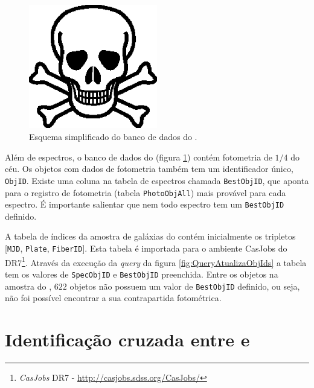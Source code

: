 \begin{figure}
	\includegraphics[width=0.5\textwidth]{figuras/test.eps}
	\caption[Esquema simplificado do banco de dados do \SDSS.]
	{Esquema simplificado do banco de dados do \SDSS.}
	\label{fig:EsquemaSDSS}
\end{figure}

Além de espectros, o banco de dados do \SDSS (figura \ref{fig:EsquemaSDSS})
contém fotometria de $1/4$ do céu. Os objetos com dados de fotometria também tem
um identificador único, \texttt{ObjID}. Existe uma coluna na tabela de espectros
chamada \texttt{BestObjID}, que aponta para o registro de fotometria (tabela
{\tt PhotoObjAll}) mais provável para cada espectro. É importante salientar que
nem todo espectro tem um \texttt{BestObjID} definido.

A tabela de índices da amostra de galáxias do \starlight contém inicialmente os
tripletos [\texttt{MJD}, \texttt{Plate}, \texttt{FiberID}]. Esta tabela é
importada para o ambiente {CasJobs} do \SDSS DR7\footnote{{\em CasJobs} \SDSS
DR7 - \url{http://casjobs.sdss.org/CasJobs/}}. Através da execução da {\em
query} da figura \ref{fig:QueryAtualizaObjIds} a tabela tem os valores de
\texttt{SpecObjID} e \texttt{BestObjID} preenchida. Entre os objetos na amostra
do \starlight, $622$ objetos não possuem um valor de \texttt{BestObjID}
definido, ou seja, não foi possível encontrar a sua contrapartida fotométrica.



\section{Identificação cruzada entre \SDSS e \galex}
\label{sec:Crossmatch:SDSSGalex}

